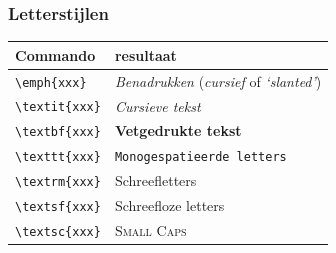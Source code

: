 \documentclass[aspectratio=169]{beamer}
\begin{document}
\begin{frame}[fragile]
  \frametitle{Letterstijlen}
  
  \begin{center}
  \begin{tabular}{ll}
    \hline
    Commando & resultaat \\
    \hline
    \verb?\emph{xxx}?   & \emph{Benadrukken} (\textrm{\emph{cursief}} of \textsf{\emph{`slanted'}})\\
    \verb?\textit{xxx}? & \textit{Cursieve tekst} \\
    \verb?\textbf{xxx}? & \textbf{Vetgedrukte tekst} \\    
    \verb?\texttt{xxx}? & \texttt{Monogespatieerde letters} \\
    \verb?\textrm{xxx}? & \textrm{Schreefletters}  \\
    \verb?\textsf{xxx}? & \textsf{Schreefloze letters}  \\
    \verb?\textsc{xxx}? & \textsc{Small Caps} \\
  \end{tabular}
  \end{center}

\end{frame}
\end{document}
